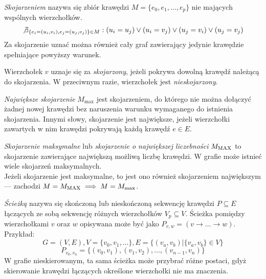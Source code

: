 \begin{definition}
  \emph{Skojarzeniem} nazywa się zbiór krawędzi $M=\{e_0, e_1, \ldots, e_p\}$
  nie mających wspólnych wierzchołków.
  \[\not\exists_{\{e_i=(u_i,v_i), e_j=(u_j, v_j)\} \in M}: (u_i=u_j) \lor (u_i=v_j) \lor (u_j=v_i) \lor (u_j=v_j)\]
  Za skojarzenie uznać można również cały graf zawierający jedynie krawędzie
  spełniające powyższy warunek.
\end{definition}

\begin{definition}
  Wierzchołek $v$ uznaje się za \emph{skojarzony}, jeżeli pokrywa dowolną
  krawędź należącą do skojarzenia.
  W przeciwnym razie, wierzchołek jest \emph{nieskojarzony}.
\end{definition}

\begin{definition}
  \emph{Największe skojarzenie} $M_{\max}$ jest skojarzeniem, do którego nie można
  dołączyć żadnej nowej krawędzi bez naruszenia warunku wymaganego do istnienia
  skojarzenia. 
  Innymi słowy, skojarzenie jest największe, jeżeli wierzchołki zawartych w nim
  krawędzi pokrywają każdą krawędź $e \in E$.
\end{definition}

\begin{definition}
  \emph{Skojarzenie maksymalne} lub \emph{skojarzenie o największej liczebności}
  $M_{\textnormal{MAX}}$ to skojarzenie zawierające największą możliwą liczbę krawędzi.
  W grafie może istnieć wiele skojarzeń maksymalnych.\\
  Jeżeli skojarzenie jest maksymalne, to jest ono również skojarzeniem największym --- zachodzi $M=M_{\textnormal{MAX}} \implies M=M_{\max}$.
\end{definition}

\begin{definition}
  \emph{Ścieżką} nazywa się skończoną lub nieskończoną sekwencję krawędzi 
  $P \subseteq E$ łączących ze sobą sekwencję różnych wierzchołków
  $V_p \subseteq V$.
  Ścieżka pomiędzy wierzchołkami $v$ oraz $w$ opisywana może być jako $P_{v,w} = (v \rightarrow \ldots \rightarrow w)$.
  Przykład:
  \[G=(V,E), V=\{v_0, v_1, \ldots\}, E=\{(v_a, v_b)| \{v_a, v_b\} \in V\}\]
  \[P_{v_0, v_n}=\{(v_0, v_1), (v_1, v_2), \ldots, (v_{n-1}, v_n)\}\]
  W grafie nieskierowanym, ta sama ścieżka może przybrać różne postaci, gdyż
  skierowanie krawędzi łączących określone wierzchołki nie ma znaczenia.
\end{definition}

